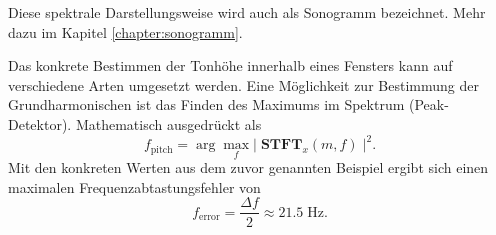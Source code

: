 Diese spektrale Darstellungsweise wird auch als Sonogramm bezeichnet.
Mehr dazu im Kapitel \ref{chapter:sonogramm}.

Das konkrete Bestimmen der Tonhöhe innerhalb eines Fensters kann auf verschiedene Arten umgesetzt werden.
Eine Möglichkeit zur Bestimmung der Grundharmonischen ist das Finden des Maximums im Spektrum (Peak-Detektor).
Mathematisch ausgedrückt als
\begin{equation}
    f_{\text{pitch}}
    =
    \arg\max_f \left| \; \mathbf{STFT}_x(m, f) \; \right|^2.
\end{equation}
Mit den konkreten Werten aus dem zuvor genannten Beispiel ergibt sich einen maximalen Frequenzabtastungsfehler von
\begin{equation}
    f_{\text{error}}
    =
    \frac{\Delta f}{2}
    \approx
    21.5\;\text{Hz}.
\end{equation}


